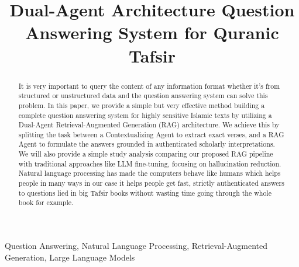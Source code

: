 \documentclass[conference]{IEEEtran}
\begin{document}
\title{Dual-Agent Architecture Question Answering System for Quranic Tafsir}

\author
{

\and
{}
}

\maketitle

\begin{abstract}
It is very important to query the content of any information format whether it’s from structured or unstructured data and the question answering system can solve this problem. In this paper, we provide a simple but very effective method building a complete question answering system for highly sensitive Islamic texts by utilizing a Dual-Agent Retrieval-Augmented Generation (RAG) architecture. We achieve this by splitting the task between a Contextualizing Agent to extract exact verses, and a RAG Agent to formulate the answers grounded in authenticated scholarly interpretations. We will also provide a simple study analysis comparing our proposed RAG pipeline with traditional approaches like LLM fine-tuning, focusing on hallucination reduction. Natural language processing has made the computers behave like humans which helps people in many ways in our case it helps people get fast, strictly authenticated answers to questions lied in big Tafsir books without wasting time going through the whole book for example.
\end{abstract}

\begin{IEEEkeywords}
Question Answering, Natural Language Processing,
Retrieval-Augmented Generation, Large Language Models
\end{IEEEkeywords}
\end{document}
